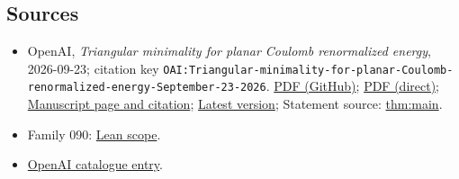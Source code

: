 \documentclass[11pt]{article}
\begin{document}
\subsection{Sources}
\begin{itemize}
\item OpenAI, \emph{Triangular minimality for planar Coulomb renormalized energy}, 2026-09-23; citation key \texttt{OAI:Triangular-minimality-for-planar-Coulomb-renormalized-energy-September-23-2026}. \href{https://github.com/openai/math/blob/adc7f1241b42e322a6451854ab7e4b4c146bf78a/preprints/Triangular-minimality-for-planar-Coulomb-renormalized-energy-September-23-2026/paper.pdf}{PDF (GitHub)}; \href{https://github.com/openai/math/raw/adc7f1241b42e322a6451854ab7e4b4c146bf78a/preprints/Triangular-minimality-for-planar-Coulomb-renormalized-energy-September-23-2026/paper.pdf}{PDF (direct)}; \href{https://github.com/openai/math/blob/adc7f1241b42e322a6451854ab7e4b4c146bf78a/preprints/Triangular-minimality-for-planar-Coulomb-renormalized-energy-September-23-2026/README.md}{Manuscript page and citation}; \href{https://github.com/openai/math/blob/main/preprints/Triangular-minimality-for-planar-Coulomb-renormalized-energy-September-23-2026/paper.pdf}{Latest version}; Statement source: \href{https://github.com/openai/math/blob/adc7f1241b42e322a6451854ab7e4b4c146bf78a/preprints/Triangular-minimality-for-planar-Coulomb-renormalized-energy-September-23-2026/build/sections/01-introduction.tex\#L64}{thm:main}.
\item Family 090: \href{https://github.com/openai/math/blob/adc7f1241b42e322a6451854ab7e4b4c146bf78a/lean/docs/090.md}{Lean scope}.
\item \href{https://github.com/openai/math/blob/adc7f1241b42e322a6451854ab7e4b4c146bf78a/CONTENTS.md}{OpenAI catalogue entry}.
\end{itemize}
\end{document}
